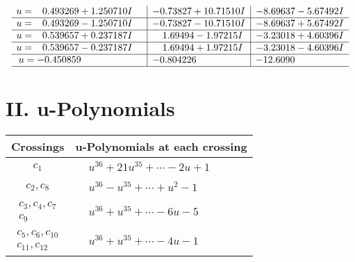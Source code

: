 \documentclass[1p]{elsarticle_modified}
\theoremstyle{definition}
\begin{document}
$$\begin{array}{c|c|c}
\begin{aligned}
u &= \phantom{-}0.493269 + 1.250710 I\end{aligned}
 & -0.73827 + 10.71510 I & -8.69637 - 5.67492 I \\ \hline\begin{aligned}
u &= \phantom{-}0.493269 - 1.250710 I\end{aligned}
 & -0.73827 - 10.71510 I & -8.69637 + 5.67492 I \\ \hline\begin{aligned}
u &= \phantom{-}0.539657 + 0.237187 I\end{aligned}
 & \phantom{-}1.69494 - 1.97215 I & -3.23018 + 4.60396 I \\ \hline\begin{aligned}
u &= \phantom{-}0.539657 - 0.237187 I\end{aligned}
 & \phantom{-}1.69494 + 1.97215 I & -3.23018 - 4.60396 I \\ \hline\begin{aligned}
u &= -0.450859\phantom{ +0.000000I}\end{aligned}
 & -0.804226\phantom{ +0.000000I} & -12.6090\phantom{ +0.000000I}\\
 \hline 
 \end{array}$$\newpage
\newpage\renewcommand{\arraystretch}{1}
\centering \section*{ II. u-Polynomials}
\begin{tabular}{m{50pt}|m{274pt}}
Crossings & \hspace{64pt}u-Polynomials at each crossing \\
\hline $$\begin{aligned}c_{1}\end{aligned}$$&$\begin{aligned}
&u^{36}+21 u^{35}+\cdots-2 u+1
\end{aligned}$\\
\hline $$\begin{aligned}c_{2},c_{8}\end{aligned}$$&$\begin{aligned}
&u^{36}- u^{35}+\cdots+u^2-1
\end{aligned}$\\
\hline $$\begin{aligned}c_{3},c_{4},c_{7}\\c_{9}\end{aligned}$$&$\begin{aligned}
&u^{36}+u^{35}+\cdots-6 u-5
\end{aligned}$\\
\hline $$\begin{aligned}c_{5},c_{6},c_{10}\\c_{11},c_{12}\end{aligned}$$&$\begin{aligned}
&u^{36}+u^{35}+\cdots-4 u-1
\end{aligned}$\\
\hline
\end{tabular}\newpage\renewcommand{\arraystretch}{1}
\end{document}
